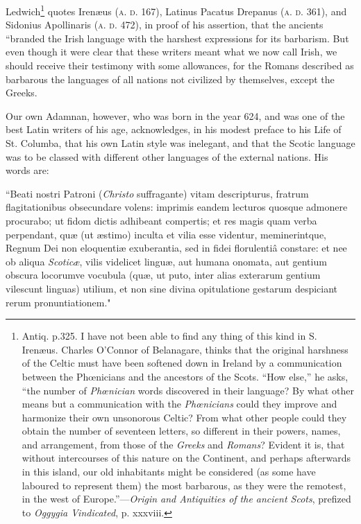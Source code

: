 \documentclass[11pt,oneside]{memoir}
\begin{document}
Ledwich\footnote{
    Antiq. p.325. I have not been able to find any thing of this kind in S. Irenæus.
    Charles O'Connor of Belanagare, thinks that the original harshness of the Celtic must have been softened down in Ireland by a communication between the Phœnicians and the ancestors of the Scots.
    ``How else,'' he asks, ``the number of \textit{Phœnician} words discovered in their language?
    By what other means but a communication with the \textit{Phœnicians} could they improve and harmonize their own unsonorous Celtic?
    From what other people could they obtain the number of seventeen letters, so different in their powers, names, and arrangement, from those of the \textit{Greeks} and \textit{Romans}?
    Evident it is, that without intercourses of this nature on the Continent, and perhaps afterwards in this island, our old inhabitants might be considered (as some have laboured to represent them) the most barbarous, as they were the remotest, in the west of Europe.''---\textit{Origin and Antiquities of the ancient Scots}, prefized to \textit{Oggygia Vindicated}, p. xxxviii.
} quotes Irenæus (\textsc{a. d.} 167), Latinus Pacatus Drepanus (\textsc{a. d.} 361), and Sidonius Apollinaris (\textsc{a. d.} 472), in proof of his assertion, that the ancients ``branded the Irish language with the harshest expressions for its barbarism. But even though it were clear that these writers meant what we now call Irish, we should receive their testimony with some allowances, for the Romans described as barbarous the languages of all nations not civilized by themselves, except the Greeks.

Our own Adamnan, however, who was born in the year 624, and was one of the best Latin writers of his age, acknowledges, in his modest preface to his Life of St. Columba, that his own Latin style was inelegant, and that the Scotic language was to be classed with different other languages of the external nations.
His words are:

``Beati nostri Patroni (\textit{Christo} suffragante) vitam descripturus, fratrum flagitationibus obsecundare volens: imprimis eandem lecturos quosque admonere procurabo; ut fidom dictis adhibeant compertis; et res magis quam verba perpendant, quæ (ut æstimo) inculta et vilia esse videntur, meminerintque, Regnum Dei non eloquentiæ exuberantia, sed in fidei florulentiâ constare: et nee ob aliqua \textit{Scoticæ}, vilis videlicet linguæ, aut humana onomata, aut gentium obscura locorumve vocubula (quæ, ut puto, inter alias exterarum gentium vilescunt linguas) utilium, et non sine divina opitulatione gestarum despiciant rerum pronuntiationem." 
\end{document}
